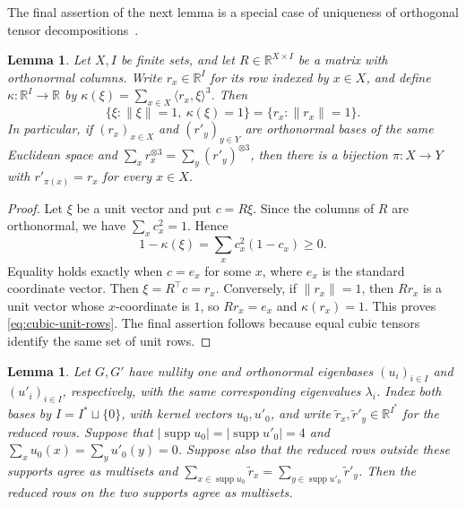 \documentclass[10pt,a4paper]{article}
\theoremstyle{plain}
\newtheorem{lemma}[theorem]{Lemma}
\theoremstyle{definition}
\DeclareMathOperator{\supp}{supp}
\newcommand{\R}{\mathbb{R}}
\begin{document}
The final assertion of the next lemma is a special case of uniqueness of
orthogonal tensor decompositions~\cite[Theorem~3.2]{ZhangGolub2001}.
\begin{lemma}\label{lem:odeco}
 Let $X,I$ be finite sets, and let $R\in\R^{X\times I}$ be a matrix
 with orthonormal columns. Write $r_x\in\R^I$ for its row indexed by
 $x\in X$, and define $\kappa:\R^I\to\R$ by
 $\kappa(\xi)=\sum_{x\in X}\langle r_x,\xi\rangle^3$.
 Then
 \begin{equation}\label{eq:cubic-unit-rows}
  \{\xi:\lVert \xi\rVert=1,\ \kappa(\xi)=1\}
  =\{r_x:\lVert r_x\rVert=1\}.
 \end{equation}
 In particular, if $(r_x)_{x\in X}$ and $(r'_y)_{y\in Y}$ are
 orthonormal bases of the same Euclidean space and
 $\sum_x r_x^{\otimes3}=\sum_y(r'_y)^{\otimes3}$, then there is a
 bijection $\pi:X\to Y$ with $r'_{\pi(x)}=r_x$ for every $x\in X$.
\end{lemma}
\begin{proof}
 Let $\xi$ be a unit vector and put $c=R\xi$.
 Since the columns of $R$ are orthonormal, we have $\sum_xc_x^2=1$. Hence
 \begin{equation}\label{eq:cubic-unit-defect}
  1-\kappa(\xi)=\sum_x c_x^2(1-c_x)\geq0.
 \end{equation}
 Equality holds exactly when $c=e_x$ for some $x$,
 where $e_x$ is the standard coordinate vector.
 Then $\xi=R^{\top}c=r_x$.
 Conversely, if $\lVert r_x\rVert=1$, then $Rr_x$ is a unit vector
 whose $x$-coordinate is $1$, so $Rr_x=e_x$ and
 $\kappa(r_x)=1$. This proves \cref{eq:cubic-unit-rows}.
 The final assertion follows because equal cubic tensors identify the
 same set of unit rows.
\end{proof}
\begin{lemma}\label{lem:four-vertex-reconstruction}
Let $G,G'$ have nullity one and orthonormal eigenbases
$(u_i)_{i\in I}$ and $(u'_i)_{i\in I}$, respectively, with the same
corresponding eigenvalues $\lambda_i$.
Index both bases by $I=I^*\sqcup\{0\}$, with kernel vectors $u_0,u'_0$,
and write $\tilde{r}_x,\tilde{r}'_y\in\R^{I^*}$ for the reduced rows.
Suppose that $|\supp u_0|=|\supp u'_0|=4$ and
$\sum_xu_0(x)=\sum_yu'_0(y)=0$.
Suppose also that the reduced rows outside these supports agree as multisets and
$\sum_{x\in\supp u_0}\tilde{r}_x=\sum_{y\in\supp u'_0}\tilde{r}'_y$.
Then the reduced rows on the two supports agree as multisets.
\end{lemma}
\end{document}
